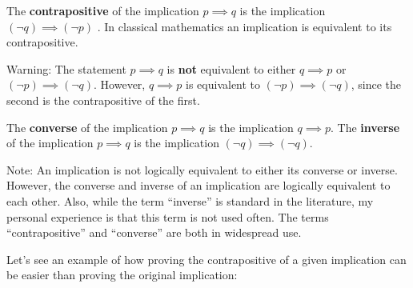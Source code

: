 \begin{theorem}
		The \textbf{contrapositive} of the implication  $p \implies q$ is the implication $(\neg q) \implies (\neg p)$ .  In classical mathematics an implication is equivalent to its contrapositive.
	\end{theorem}

Warning:  The statement $p \implies q$ is \textbf{not} equivalent to either $q \implies p$ or  $(\neg p) \implies (\neg q)$.  However, $q \implies p$ is equivalent to   $(\neg p) \implies (\neg q)$,  since the second is the contrapositive of the first.

\begin{definition}
		The \textbf{converse} of the implication $p \implies q$ is the implication $q \implies p$.  The \textbf{inverse} of the implication $p \implies q$ is the implication $(\neg q) \implies (\neg q)$.  
	\end{definition}

Note:  An implication is not logically equivalent to either its converse or inverse.  However, the converse and inverse of an implication are logically equivalent to each other.  Also, while the term ``inverse'' is standard in the literature, my personal experience is that this term is not used often.  The terms ``contrapositive'' and ``converse'' are both in widespread use.

Let's see an example of how proving the contrapositive of a given implication can be easier than proving the original implication:

